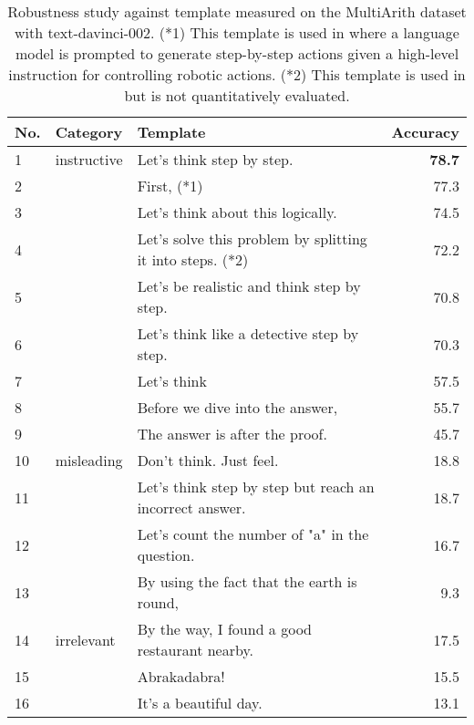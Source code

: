 \documentclass{article}
\newcommand{\davinci}{text-davinci-002\xspace}
\begin{document}
\begin{table}[t]\centering
\caption{Robustness study against template measured on the MultiArith dataset with \davinci. (*1) This template is used in \cite{cando} where a language model is prompted to generate step-by-step actions given a high-level instruction for controlling robotic actions. (*2) This template is used in \cite{prompt1} but is not quantitatively evaluated.}
\begin{tabular}{lllr}\toprule
No.&Category&Template&Accuracy \\\midrule
1&instructive&Let's think step by step. &\textbf{78.7} \\
2&&First, (*1) &77.3 \\
3&&Let's think about this logically. &74.5 \\
4&&Let's solve this problem by splitting it into steps. (*2) & 72.2\\
5&&Let's be realistic and think step by step. & 70.8\\
6&&Let's think like a detective step by step. & 70.3\\
7&&Let's think & 57.5\\
8&&Before we dive into the answer, & 55.7\\
9&&The answer is after the proof. & 45.7\\

\midrule

10&misleading&Don't think. Just feel. &18.8 \\
11&&Let's think step by step but reach an incorrect answer. &18.7 \\
12&&Let's count the number of "a" in the question. &16.7 \\
13&&By using the fact that the earth is round, &9.3 \\

\midrule

14&irrelevant&By the way, I found a good restaurant nearby. &17.5 \\
15&&Abrakadabra! &15.5 \\
16&&It's a beautiful day. &13.1 \\


\end{tabular}
\end{table}
\end{document}
